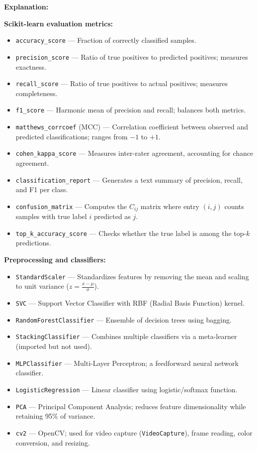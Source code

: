 \documentclass[a4paper, 12pt]{article}
\newenvironment{explanation}{%
  \par\smallskip
  \noindent\textcolor{blue!70!black}{\textbf{Explanation:}}\\
  \noindent
}{\par\medskip}
\begin{document}
\begin{explanation}
\textbf{Scikit-learn evaluation metrics:}
\begin{itemize}[nosep]
  \item \texttt{accuracy\_score} --- Fraction of correctly classified samples.
  \item \texttt{precision\_score} --- Ratio of true positives to predicted positives; measures exactness.
  \item \texttt{recall\_score} --- Ratio of true positives to actual positives; measures completeness.
  \item \texttt{f1\_score} --- Harmonic mean of precision and recall; balances both metrics.
  \item \texttt{matthews\_corrcoef} (MCC) --- Correlation coefficient between observed and predicted classifications; ranges from $-1$ to $+1$.
  \item \texttt{cohen\_kappa\_score} --- Measures inter-rater agreement, accounting for chance agreement.
  \item \texttt{classification\_report} --- Generates a text summary of precision, recall, and F1 per class.
  \item \texttt{confusion\_matrix} --- Computes the $C_{ij}$ matrix where entry $(i,j)$ counts samples with true label $i$ predicted as $j$.
  \item \texttt{top\_k\_accuracy\_score} --- Checks whether the true label is among the top-$k$ predictions.
\end{itemize}

\textbf{Preprocessing and classifiers:}
\begin{itemize}[nosep]
  \item \texttt{StandardScaler} --- Standardizes features by removing the mean and scaling to unit variance ($z = \frac{x - \mu}{\sigma}$).
  \item \texttt{SVC} --- Support Vector Classifier with RBF (Radial Basis Function) kernel.
  \item \texttt{RandomForestClassifier} --- Ensemble of decision trees using bagging.
  \item \texttt{StackingClassifier} --- Combines multiple classifiers via a meta-learner (imported but not used).
  \item \texttt{MLPClassifier} --- Multi-Layer Perceptron; a feedforward neural network classifier.
  \item \texttt{LogisticRegression} --- Linear classifier using logistic/softmax function.

  \item \texttt{PCA} --- Principal Component Analysis; reduces feature dimensionality while retaining 95\% of variance.
  \item \texttt{cv2} --- OpenCV; used for video capture (\texttt{VideoCapture}), frame reading, color conversion, and resizing.
\end{itemize}
\end{explanation}
\end{document}

